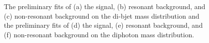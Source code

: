 \documentclass{cmspaper}
\begin{document}
\begin{figure}[h!]
  \centering
  \caption{The preliminary fits of (a) the signal, (b) resonant background, and (c) non-resonant background on the di-bjet mass distribution and the preliminary fits of (d) the signal, (e) resonant background, and (f) non-resonant background on the diphoton mass distribution.}
  \label{fig:prelimTwoDFits}
\end{figure}
\end{document}
